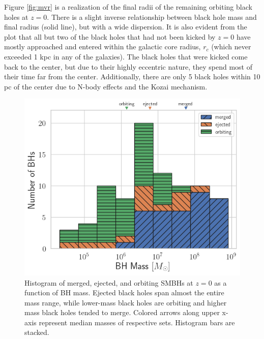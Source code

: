 \documentclass[fleqn,usenatbib,useAMS]{mnras}
\begin{document}
Figure \ref{fig:mvr} is a realization of the final radii of the remaining orbiting black holes at $z=0$.  There is a slight inverse relationship between black hole mass and final radius (solid line), but with a wide dispersion.  It is also evident from the plot that all but two of the black holes that had not been kicked by $z=0$ have mostly approached and entered within the galactic core radius, $r_c$ (which never exceeded 1 kpc in any of the galaxies).  The black holes that were kicked come back to the center, but due to their highly eccentric nature, they spend most of their time far from the center.  Additionally, there are only 5 black holes within 10 pc of the center due to N-body effects and the Kozai mechanism.

\begin{figure}
\begin{center}
\includegraphics[width=1.0\columnwidth]{plots/Summary_Results_All_Galaxies.png}
\caption{Histogram of merged, ejected, and orbiting SMBHs at $z=0$ as a function of BH mass.  Ejected black holes span almost the entire mass range, while lower-mass black holes are orbiting and higher mass black holes tended to merge.  Colored arrows along upper x-axis represent median masses of respective sets.  Histogram bars are stacked.}
\label{fig:meosmbh}
\end{center}
\end{figure}
\end{document}
